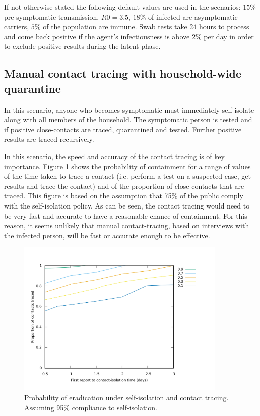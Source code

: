 \documentclass{article}
\begin{document}
If not otherwise stated the following default values are used in the scenarios: $15\%$ pre-symptomatic transmission, $R0 = 3.5$, $18\%$ of infected are asymptomatic carriers, $5\%$ of the population are immune. Swab tests take 24 hours to process and come back positive if the agent's infectiousness is above $2\%$ per day in order to exclude positive results during the latent phase.

\subsection{Manual contact tracing with household-wide quarantine}

In this scenario, anyone who becomes symptomatic must immediately self-isolate along with all members of the household. The symptomatic person is tested and if positive close-contacts are traced, quarantined and tested. Further positive results are traced recursively.

In this scenario, the speed and accuracy of the contact tracing is of key importance. Figure \ref{tracingContour} shows the probability of containment for a range of values of the time taken to trace a contact (i.e. perform a test on a suspected case, get results and trace the contact) and of the proportion of close contacts that are traced. This figure is based on the assumption that 75\% of the public comply with the self-isolation policy. As can be seen, the contact tracing would need to be very fast and accurate to have a reasonable chance of containment. For this reason, it seems unlikely that manual contact-tracing, based on interviews with the infected person, will be fast or accurate enough to be effective.

\begin{figure}
\begin{center}
\includegraphics[width = 10cm]{tracingContour.pdf}
\end{center}
\caption{Probability of eradication under self-isolation and contact tracing. Assuming 95\% compliance to self-isolation.}
\label{tracingContour}
\end{figure}
\end{document}

